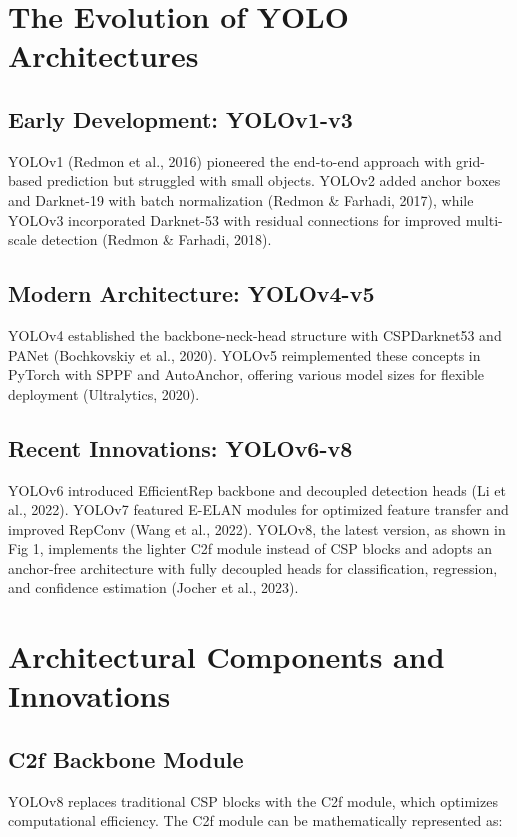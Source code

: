 \documentclass[11pt]{article}
\begin{document}
\section{The Evolution of YOLO Architectures}

\subsection{Early Development: YOLOv1-v3}
YOLOv1 (Redmon et al., 2016) pioneered the end-to-end approach with grid-based prediction but struggled with small objects. YOLOv2 added anchor boxes and Darknet-19 with batch normalization (Redmon \& Farhadi, 2017), while YOLOv3 incorporated Darknet-53 with residual connections for improved multi-scale detection (Redmon \& Farhadi, 2018).

\subsection{Modern Architecture: YOLOv4-v5}
YOLOv4 established the backbone-neck-head structure with CSPDarknet53 and PANet (Bochkovskiy et al., 2020). YOLOv5 reimplemented these concepts in PyTorch with SPPF and AutoAnchor, offering various model sizes for flexible deployment (Ultralytics, 2020).

\subsection{Recent Innovations: YOLOv6-v8}
YOLOv6 introduced EfficientRep backbone and decoupled detection heads (Li et al., 2022). YOLOv7 featured E-ELAN modules for optimized feature transfer and improved RepConv (Wang et al., 2022). YOLOv8, the latest version, as shown in Fig 1, implements the lighter C2f module instead of CSP blocks and adopts an anchor-free architecture with fully decoupled heads for classification, regression, and confidence estimation (Jocher et al., 2023).

\section{Architectural Components and Innovations}

\subsection{C2f Backbone Module}
YOLOv8 replaces traditional CSP blocks with the C2f module, which optimizes computational efficiency. The C2f module can be mathematically represented as:
\end{document}

